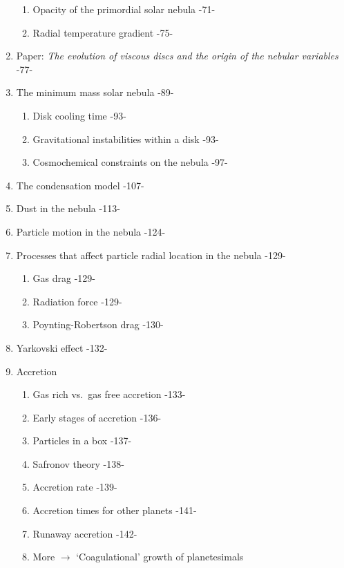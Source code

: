 \documentclass[12pt]{article}
\begin{document}
\begin{enumerate}[label=\Roman*.]
\begin{enumerate}[label=\arabic*.]
            \item Opacity of the primordial solar nebula -71-
            \item Radial temperature gradient -75-
        \end{enumerate}
    \item Paper: \textit{The evolution of viscous discs and the origin of the
        nebular variables} -77-
    \item The minimum mass solar nebula -89-
        \begin{enumerate}[label=\arabic*.]
            \item Disk cooling time -93-
            \item Gravitational instabilities within a disk -93-
            \item Cosmochemical constraints on the nebula -97-
        \end{enumerate}
    \item The condensation model -107-
    \item Dust in the nebula -113-
    \item Particle motion in the nebula -124-
    \item Processes that affect particle radial location in the nebula -129-
        \begin{enumerate}[label=\arabic*.]
            \item Gas drag -129-
            \item Radiation force -129-
            \item Poynting-Robertson drag -130-
        \end{enumerate}
    \item Yarkovski effect -132-
    \item Accretion
        \begin{enumerate}[label=\arabic*.]
            \item Gas rich vs.\ gas free accretion -133-
            \item Early stages of accretion -136-
            \item Particles in a box -137-
            \item Safronov theory -138-
            \item Accretion rate -139-
            \item Accretion times for other planets -141-
            \item Runaway accretion -142-
            \item More $\rightarrow$ `Coagulational' growth of planetesimals

\end{enumerate}
\end{enumerate}
\end{document}
